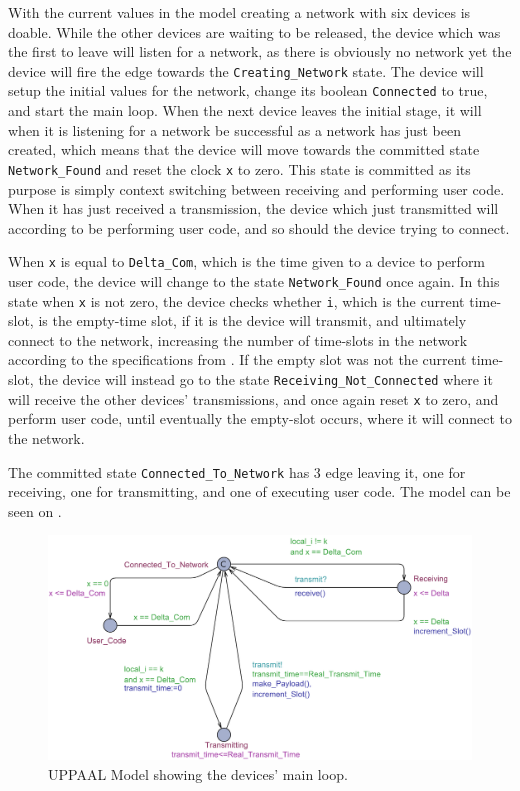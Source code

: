 With the current values in the model creating a network with six devices is doable.
While the other devices are waiting to be released, the device which was the first to leave will listen for a network, as there is obviously no network yet the device will fire the edge towards the \texttt{Creating\_Network} state.
The device will setup the initial values for the network, change its boolean \texttt{Connected} to true, and start the main loop.
When the next device leaves the initial stage, it will when it is listening for a network be successful as a network has just been created, which means that the device will move towards the committed state \texttt{Network\_Found} and reset the clock \texttt{x} to zero.
This state is committed as its purpose is simply context switching between receiving and performing user code.
When it has just received a transmission, the device which just transmitted will according to  be performing user code, and so should the device trying to connect.

When \texttt{x} is equal to \texttt{Delta\_Com}, which is the time given to a device to perform user code, the device will change to the state \texttt{Network\_Found} once again.
In this state when \texttt{x} is not zero, the device checks whether \texttt{i}, which is the current time-slot, is the empty-time slot, if it is the device will transmit, and ultimately connect to the network, increasing the number of time-slots in the network according to the specifications from .
If the empty slot was not the current time-slot, the device will instead go to the state \texttt{Receiving\_Not\_Connected} where it will receive the other devices' transmissions, and once again reset \texttt{x} to zero, and perform user code, until eventually the empty-slot occurs, where it will connect to the network.

The committed state \texttt{Connected\_To\_Network} has 3 edge leaving it, one for receiving, one for transmitting, and one of executing user code.
The model can be seen on .

\begin{figure}
  \includegraphics[width=1\textwidth]{Figures/Model/Device_Connected.pdf} 
\caption{UPPAAL Model showing the devices' main loop.}
\label{fig:UPPAAL_Connected}
\end{figure}

